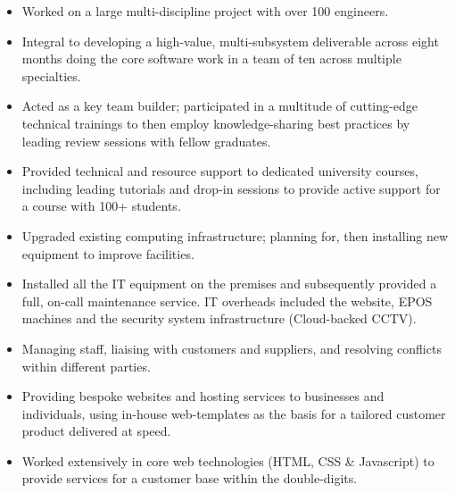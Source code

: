 \documentclass[8pt,a4paper]{altacv}
\begin{document}
\begin{itemize}
\item Worked on a large multi-discipline project with over 100 engineers.
\item Integral to developing a high-value, multi-subsystem deliverable across eight months doing the core software work in a team of ten across multiple specialties.
\item Acted as a key team builder; participated in a multitude of cutting-edge technical trainings to then employ knowledge-sharing best practices by leading review sessions with fellow graduates. 

\divider
\end{itemize}

\begin{itemize}
\item Provided technical and resource support to dedicated university courses, including leading tutorials and drop-in sessions to provide active support for a course with 100+ students.
\item Upgraded existing computing infrastructure; planning for, then installing new equipment to improve facilities.
\divider
\end{itemize}

\begin{itemize}
\item Installed all the IT equipment on the premises and subsequently provided a full, on-call maintenance service. IT overheads included the website, EPOS machines and the security system infrastructure (Cloud-backed CCTV).
\item Managing staff, liaising with customers and suppliers, and resolving conflicts within different parties. 
\divider
\end{itemize}

\begin{itemize}
\item Providing bespoke websites and hosting services to businesses and individuals, using in-house web-templates as the basis for a tailored customer product delivered at speed. 
\item Worked extensively in core web technologies (HTML, CSS \& Javascript) to provide services for a customer base within the double-digits.  
\end{itemize}
\divider
\end{document}
